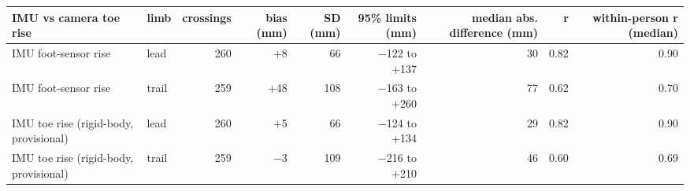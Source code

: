\begin{adjustbox}{max width=\textwidth}
{\scriptsize
\begin{tabular}{llrrrrrrr}
\toprule
\textbf{IMU vs camera toe rise} & \textbf{limb} & \textbf{crossings} & \textbf{bias (mm)} & \textbf{SD (mm)} & \textbf{95\% limits (mm)} & \textbf{median abs. difference (mm)} & \textbf{r} & \textbf{within-person r (median)} \\
\midrule
IMU foot-sensor rise & lead & 260 & +8 & 66 & $-$122 to +137 & 30 & 0.82 & 0.90 \\
IMU foot-sensor rise & trail & 259 & +48 & 108 & $-$163 to +260 & 77 & 0.62 & 0.70 \\
IMU toe rise (rigid-body, provisional) & lead & 260 & +5 & 66 & $-$124 to +134 & 29 & 0.82 & 0.90 \\
IMU toe rise (rigid-body, provisional) & trail & 259 & $-$3 & 109 & $-$216 to +210 & 46 & 0.60 & 0.69 \\
\bottomrule
\end{tabular}
}
\end{adjustbox}
